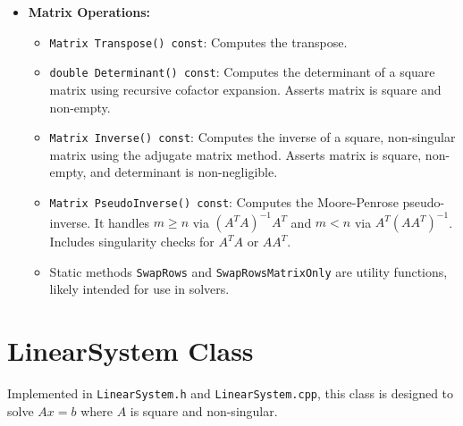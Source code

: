 \begin{itemize}
\begin{itemize}
        \end{itemize}
    \item \textbf{Matrix Operations:}
        \begin{itemize}
            \item \texttt{Matrix Transpose() const}: Computes the transpose.
            \item \texttt{double Determinant() const}: Computes the determinant of a square matrix using recursive cofactor expansion. Asserts matrix is square and non-empty.
            \item \texttt{Matrix Inverse() const}: Computes the inverse of a square, non-singular matrix using the adjugate matrix method. Asserts matrix is square, non-empty, and determinant is non-negligible.
            \item \texttt{Matrix PseudoInverse() const}: Computes the Moore-Penrose pseudo-inverse. It handles $m \ge n$ via $(A^T A)^{-1} A^T$ and $m < n$ via $A^T (A A^T)^{-1}$. Includes singularity checks for $A^T A$ or $A A^T$.
            \item Static methods \texttt{SwapRows} and \texttt{SwapRowsMatrixOnly} are utility functions, likely intended for use in solvers.
        \end{itemize}
\end{itemize}

\section{LinearSystem Class}
\label{sec:linearsystem_class}

Implemented in \texttt{LinearSystem.h} and \texttt{LinearSystem.cpp}, this class is designed to solve $Ax=b$ where $A$ is square and non-singular.

\begin{figure}[H]

\end{figure}

